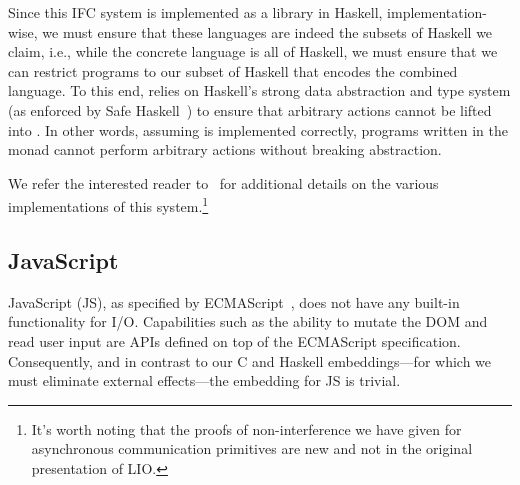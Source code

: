 \documentclass{sigplanconf}
\begin{document}
Since this IFC system is implemented as a library in Haskell,
implementation-wise, we must ensure that these languages are indeed the subsets of Haskell
we claim, i.e., while the concrete language is all of Haskell, we must
ensure that we can restrict programs to our subset of Haskell that
encodes the combined language.
%
To this end,  relies on Haskell's strong data abstraction and type system
(as enforced by Safe Haskell~\cite{Terei:2012:SH:2364506.2364524}) to
ensure that arbitrary  actions cannot be lifted into
.
%
In other words, assuming  is implemented correctly, programs
written in the  monad cannot perform arbitrary  actions
without breaking abstraction.

We refer the interested reader to~\cite{lio,stefan:addressing-covert} for
additional details on the various implementations of this system.\footnote{It's worth noting that the proofs of non-interference we have given for asynchronous communication primitives are new and not in the original presentation of LIO.}


\subsection{JavaScript}
\label{sec:real:js}

JavaScript (JS), as specified by ECMAScript~\cite{ecma}, does not have any
built-in functionality for I/O. Capabilities such as the ability to
mutate the DOM and read user input are APIs defined on top of the ECMAScript
specification.
%
Consequently, and in contrast to our C and Haskell embeddings---for
which we must eliminate external effects---the embedding for JS is
trivial.
\end{document}
